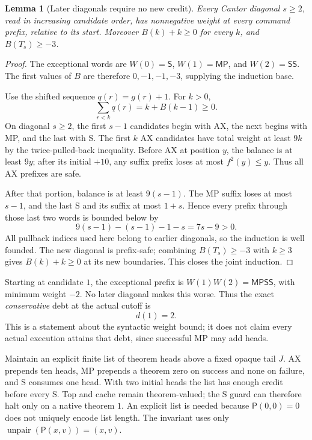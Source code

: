 \documentclass[11pt]{article}
\newtheorem{lemma}[theorem]{Lemma}
\newcommand{\pair}{\mathsf P}
\newcommand{\MP}{\mathsf{MP}}
\newcommand{\Tr}{\mathsf S}
\begin{document}
\begin{lemma}[Later diagonals require no new credit]
Every Cantor diagonal $s\ge2$, read in increasing candidate
order, has nonnegative weight at every command prefix,
relative to its start. Moreover $B(k)+k\ge0$ for every $k$,
and $B(T_s)\ge-3$.
\end{lemma}
\begin{proof}
The exceptional words are $W(0)=\Tr$, $W(1)=\MP$,
and $W(2)=\Tr\Tr$. The first values of $B$ are therefore
$0,-1,-1,-3$, supplying the induction base.

Use the shifted sequence $q(r)=g(r)+1$. For $k>0$,
\[
                   \sum_{r<k}q(r)=k+B(k-1)\ge0.
\]
On diagonal $s\ge2$, the first $s-1$ candidates begin
with AX, the next begins with MP, and the last with S.
The first $k$ AX candidates have total weight at least
$9k$ by the twice-pulled-back inequality. Before AX
at position $y$, the balance is at least $9y$; after
its initial $+10$, any suffix prefix loses at most
$f^2(y)\le y$. Thus all AX prefixes are safe.

After that portion, balance is at least $9(s-1)$.
The MP suffix loses at most $s-1$, and the last S
and its suffix at most $1+s$. Hence every prefix
through those last two words is bounded below by
\[
                    9(s-1)-(s-1)-1-s=7s-9>0.
\]
All pullback indices used here belong to earlier
diagonals, so the induction is well founded.
The new diagonal is prefix-safe; combining
$B(T_s)\ge-3$ with $k\ge3$ gives $B(k)+k\ge0$ at
its new boundaries. This closes the joint induction.
\end{proof}

Starting at candidate $1$, the exceptional prefix is
$W(1)W(2)=\MP\Tr\Tr$, with minimum weight $-2$.
No later diagonal makes this worse. Thus the exact
\emph{conservative} debt at the actual cutoff is
\[
                             d(1)=2.
\]
This is a statement about the syntactic weight bound;
it does not claim every actual execution attains
that debt, since successful MP may add heads.

Maintain an explicit finite list of theorem heads
above a fixed opaque tail $J$. AX prepends ten heads,
MP prepends a theorem zero on success and none on
failure, and S consumes one head. With two initial
heads the list has enough credit before every S.
Top and cache remain theorem-valued; the S guard
can therefore halt only on a native theorem $1$.
An explicit list is needed because $\pair(0,0)=0$
does not uniquely encode list length. The invariant
uses only
$\operatorname{unpair}(\pair(x,v))=(x,v)$.
\end{document}
